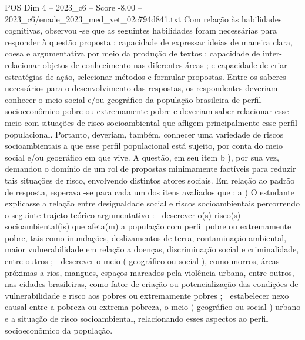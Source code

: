 \begin{textsample}{POS Dim 4 – 2023\_c6 – Score -8.00 – 2023\_c6/enade\_2023\_med\_vet\_02c794d841.txt}
Com relação às habilidades cognitivas, observou -se que as seguintes habilidades foram necessárias para responder à questão proposta : capacidade de expressar ideias de maneira clara, coesa e argumentativa por meio da produção de textos ; capacidade de inter-relacionar objetos de conhecimento nas diferentes áreas ; e capacidade de criar estratégias de ação, selecionar métodos e formular propostas.
Entre os saberes necessários para o desenvolvimento das respostas, os respondentes deveriam conhecer o meio social e/ou geográfico da população brasileira de perfil socioeconômico pobre ou extremamente pobre e deveriam saber relacionar esse meio com situações de risco socioambiental que afligem principalmente esse perfil populacional.
Portanto, deveriam, também, conhecer uma variedade de riscos socioambientais a que esse perfil populacional está sujeito, por conta do meio social e/ou geográfico em que vive.
A questão, em seu item b ), por sua vez, demandou o domínio de um rol de propostas minimamente factíveis para reduzir tais situações de risco, envolvendo distintos atores sociais.
Em relação ao padrão de resposta, esperava -se para cada um dos itens avaliados que : a ) O estudante explicasse a relação entre desigualdade social e riscos socioambientais percorrendo o seguinte trajeto teórico-argumentativo :  descrever o(s) risco(s) socioambiental(is) que afeta(m) a população com perfil pobre ou extremamente pobre, tais como inundações, deslizamentos de terra, contaminação ambiental, maior vulnerabilidade em relação a doenças, discriminação social e criminalidade, entre outros ;  descrever o meio ( geográfico ou social ), como morros, áreas próximas a rios, mangues, espaços marcados pela violência urbana, entre outros, nas cidades brasileiras, como fator de criação ou potencialização das condições de vulnerabilidade e risco aos pobres ou extremamente pobres ;  estabelecer nexo causal entre a pobreza ou extrema pobreza, o meio ( geográfico ou social ) urbano e a situação de risco socioambiental, relacionando esses aspectos ao perfil socioeconômico da população.

\end{textsample}
